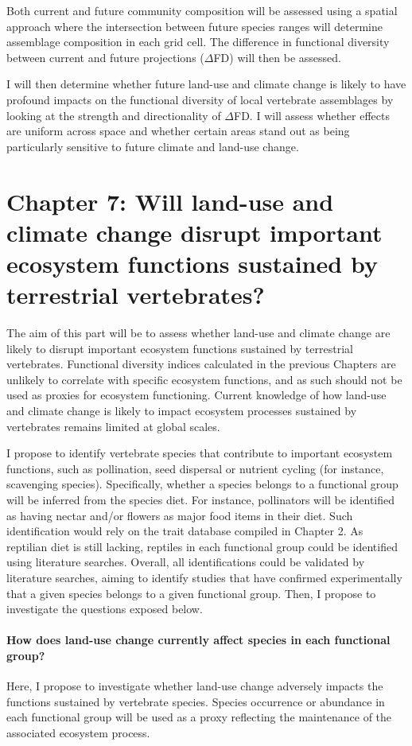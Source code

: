 Both current and future community composition will be assessed using a spatial approach where the intersection between future species ranges will determine assemblage composition in each grid cell. The difference in functional diversity between current and future projections ($\Delta$FD) will then be assessed. 

I will then determine whether future land-use and climate change is likely to have profound impacts on the functional diversity of local vertebrate assemblages by looking at the strength and directionality of $\Delta$FD.  I will assess whether effects are uniform across space and whether certain areas stand out as being particularly sensitive to future climate and land-use change. 


\section{Chapter 7: Will land-use and climate change disrupt important ecosystem functions sustained by terrestrial vertebrates?}
The aim of this part will be to assess whether land-use and climate change are likely to disrupt important ecosystem functions sustained by terrestrial vertebrates. Functional diversity indices calculated in the previous Chapters are unlikely to correlate with specific ecosystem functions, and as such should not be used as proxies for ecosystem functioning. Current knowledge of how land-use and climate change is likely to impact ecosystem processes sustained by vertebrates remains limited at global scales.

I propose to identify vertebrate species that contribute to important ecosystem functions, such as pollination, seed dispersal or nutrient cycling (for instance, scavenging species). Specifically, whether a species belongs to a functional group will be inferred from the species diet. For instance, pollinators will be identified as having nectar and/or flowers as major food items in their diet. Such identification would rely on the trait database compiled in Chapter 2. As reptilian diet is still lacking, reptiles in each functional group could be identified using literature searches. Overall, all identifications could be validated by literature searches, aiming to identify studies that have confirmed experimentally that a given species belongs to a given functional group. Then, I propose to investigate the questions exposed below.

\paragraph{How does land-use change currently affect species in each functional group?}
Here, I propose to investigate whether land-use change adversely impacts the functions sustained by vertebrate species. Species occurrence or abundance in each functional group will be used as a proxy reflecting the maintenance of the associated ecosystem process.


